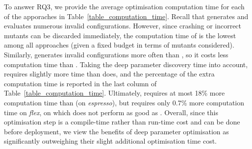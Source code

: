 To answer RQ3, we provide the average optimisation computation time for each of the apporaches in Table~\ref{table_computation_time}. Recall that \dr{} generates and evaluates numerous invalid configurations. However, since crashing or incorrect mutants can be discarded immediately, the computation time of \dr{} is the lowest among all approaches (given a fixed budget in terms of mutants considered). Similarly, \dn{} generates invalid configurations more often than \sn{}, so it costs less computation time than \sn{}. Taking the deep parameter discovery time into account, \dn{} requires slightly more time than \sn{} does, and the percentage of the extra computation time is reported in the last column of Table~\ref{table_computation_time}. Ultimately, \dn{} requires at most 18\% more computation time than \sn{} (on \emph{espresso}), but requires only 0.7\% more computation time on \emph{flex}, on which \dn{} does not perform as good as \sn{}. Overall, since this optimisation step is a compile-time rather than run-time cost and can be done before deployment, we view the benefits of deep parameter optimisation as significantly outweighing their slight additional optimisation time cost.
